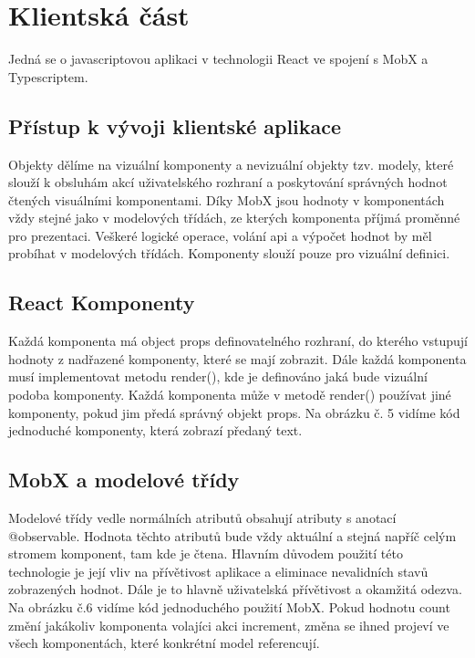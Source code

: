 \documentclass[FM,BP]{tulthesis}
\begin{document}
    \section{Klientská část}
        Jedná se o javascriptovou aplikaci v technologii React ve spojení s MobX a Typescriptem.
        
        \subsection{Přístup k vývoji klientské aplikace}
            Objekty dělíme na vizuální komponenty a nevizuální objekty tzv. modely, 
            které slouží k obsluhám akcí uživatelského rozhraní a poskytování správných hodnot čtených visuálními komponentami.
            Díky MobX jsou hodnoty v komponentách vždy stejné jako v modelových třídách, 
            ze kterých komponenta příjmá proměnné pro prezentaci.
            Veškeré logické operace, volání api a výpočet hodnot by měl probíhat v modelových třídách. 
            Komponenty slouží pouze pro vizuální definici.

        \subsection{React Komponenty}
            Každá komponenta má object props definovatelného rozhraní, do kterého vstupují hodnoty z nadřazené komponenty, které se mají zobrazit.
            Dále každá komponenta musí implementovat metodu render(), kde je definováno jaká bude vizuální podoba komponenty.
            Každá komponenta může v metodě render() používat jiné komponenty, pokud jim předá správný objekt props.
            Na obrázku č. 5 vidíme kód jednoduché komponenty, která zobrazí předaný text.

        \subsection{MobX a modelové třídy}
            Modelové třídy vedle normálních atributů obsahují atributy s anotací @observable. 
            Hodnota těchto atributů bude vždy aktuální a stejná napříč celým stromem komponent, tam kde je čtena.
            Hlavním důvodem použití této technologie je její vliv na přívětivost aplikace a eliminace nevalidních stavů zobrazených hodnot.
            Dále je to hlavně uživatelská přívětivost a okamžitá odezva.
            Na obrázku č.6 vidíme kód jednoduchého použití MobX. Pokud hodnotu count změní jakákoliv komponenta volajíci akci increment, 
            změna se ihned projeví ve všech komponentách, které konkrétní model referencují.
\end{document}
